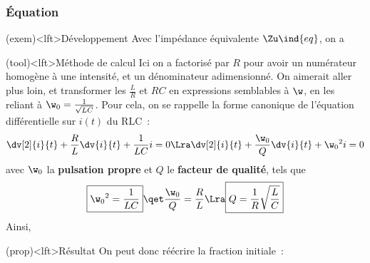 \documentclass[../../main/main.tex]{subfiles}
\begin{document}
\subsubsection{Équation}
\begin{tcb}(exem)<lft>{Développement}
	Avec l'impédance équivalente $\Zu\ind{eq}$, on a
	\vspace{-15pt}
\end{tcb}
\begin{tcb}(tool)<lft>{Méthode de calcul}
	Ici on a factorisé par $R$ pour avoir un numérateur homogène à une intensité,
	et un dénominateur adimensionné. On aimerait aller plus loin, et transformer
	les $\frac{L}{R}$ et $RC$ en expressions semblables à $\w$, en les reliant à
	$\w_0 = \frac{1}{\sqrt{LC}}$. Pour cela, on se rappelle la forme canonique de
	l'équation différentielle sur $i(t)$ du RLC~:
	\[
		\dv[2]{i}{t} + \frac{R}{L} \dv{i}{t} + \frac{1}{LC}i = 0
		\Lra
		\dv[2]{i}{t} + \frac{\w_0}{Q} \dv{i}{t} + \w_0{}^2i = 0
	\]
	avec $\w_0$ la \textbf{pulsation propre} et $Q$ le \textbf{facteur de qualité},
	tels que
	\begin{gather*}
		\boxed{\w_0{}^2 = \frac{1}{LC}}
		\qet
		\frac{\w_0}{Q} = \frac{R}{L}
		\Lra
		\boxed{Q = \frac{1}{R} \sqrt{\frac{L}{C}}}
	\end{gather*}
	Ainsi,
\end{tcb}
\begin{tcb}(prop)<lft>{Résultat}
	On peut donc réécrire la fraction initiale~:
	\vspace{-15pt}
\end{tcb}
\end{document}
